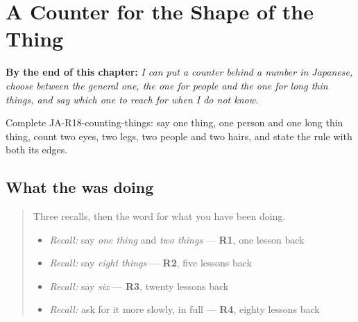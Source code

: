 
\chapter{A Counter for the Shape of the Thing}
\label{ch:ja-counters}

\begin{chapteropening}
\textbf{By the end of this chapter:} \emph{I can put a counter behind a number in Japanese, choose between the general one, the one for people and the one for long thin things, and say which one to reach for when I do not know.}

Complete JA-R18-counting-things: say one thing, one person and one long thin thing, count two eyes, two legs, two people and two hairs, and state the rule with both its edges.
\end{chapteropening}

\section[\texorpdfstring{…\ja{つ} (-tsu)}{…つ (-tsu)}]{What the  was doing}

\label{lesson:JA-C18-tsu-counter}



\begin{quote}
Three recalls, then the word for what you have been doing.

\begin{itemize}
\raggedright
  \item \emph{Recall:} say \emph{one thing} and \emph{two things} — \textbf{R1}, one lesson back
  \item \emph{Recall:} say \emph{eight things} — \textbf{R2}, five lessons back
  \item \emph{Recall:} say \emph{six} — \textbf{R3}, twenty lessons back
  \item \emph{Recall:} ask for it more slowly, in full — \textbf{R4}, eighty lessons back
\end{itemize}
\end{quote}

